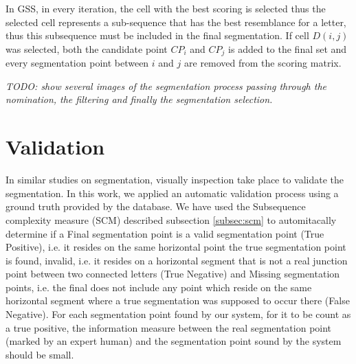 \documentclass[journal,compsoc]{IEEEtran}
\begin{document}

In GSS, in every iteration, the cell with the best scoring is selected thus the selected cell represents a sub-sequence that has the best resemblance for a letter, thus this subsequence must be included in the final segmentation. If cell $D(i,j)$ was selected, both the candidate point $CP_{i}$ and $CP_{j}$ is added to the final set and every segmentation point between $i$ and $j$ are removed from the scoring matrix.

\emph{TODO: show several images of the segmentation process passing through the nomination, the filtering and finally the segmentation selection.}

\section{Validation}
\label{sec:validation}
In similar studies on segmentation, visually inspection take place to validate the segmentation. In this work, we applied an automatic validation process using a ground truth provided by the database. We have used the Subsequence complexity measure (SCM) described subsection \ref{subsec:scm} to automitacally determine if a Final segmentation point is a valid segmentation point (True Positive), i.e. it resides on the same horizontal point the true segmentation point is found, invalid, i.e. it resides on a horizontal segment that is not a real junction point between two connected letters (True Negative) and Missing segmentation points, i.e. the final does not include any point which reside on the same horizontal segment where a true segmentation was supposed to occur there (False Negative).  
For each segmentation point found by our system, for it to be count as a true positive, the information measure between the real segmentation point (marked by an expert human) and the segmentation point sound by the system should be small.
\end{document}
